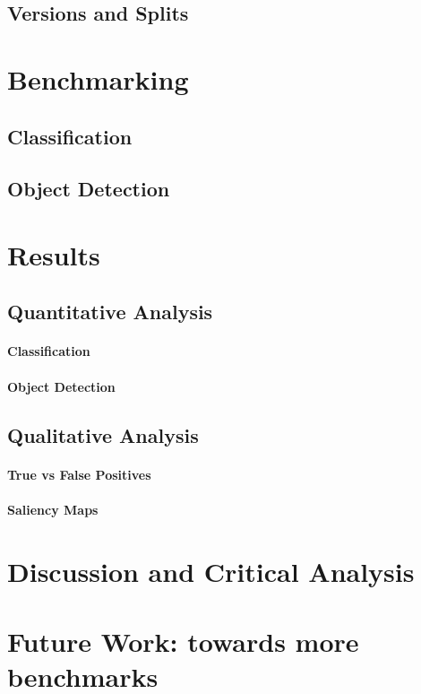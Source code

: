 \subsection{Versions and Splits}



\begin{figure}[htb!]
	
	\caption{}
	\label{fig:hypernym_distribution}
\end{figure}



\section{Benchmarking}
\label{sec:benchmarking}

\subsection{Classification}
\subsection{Object Detection}


\section{Results}
\label{sec:results}

\subsection{Quantitative Analysis}
\paragraph{Classification}
\paragraph{Object Detection}

\subsection{Qualitative Analysis}
\paragraph{True vs False Positives}
\paragraph{Saliency Maps}


\section{Discussion and Critical Analysis}
\label{sec:discussion}


\section{Future Work: towards more benchmarks}
\label{sec:future_work}
